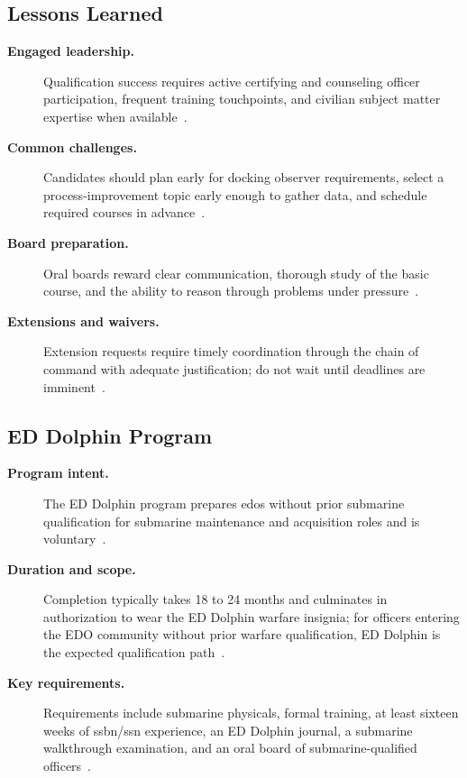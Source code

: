 \documentclass[../main.tex]{subfiles}
\begin{document}
\subsection{Lessons Learned}
\begin{description}
  \item[\textbf{Engaged leadership.}] Qualification success requires active certifying and counseling officer
  participation, frequent training touchpoints, and civilian subject matter expertise when available~\autocite{edo-5-2-2-edqp-2025}.
  \item[\textbf{Common challenges.}] Candidates should plan early for docking observer requirements, select
  a process-improvement topic early enough to gather data, and schedule required courses in advance~\autocite{edo-5-2-2-edqp-2025}.
  \item[\textbf{Board preparation.}] Oral boards reward clear communication, thorough study of the basic
  course, and the ability to reason through problems under pressure~\autocite{edo-5-2-2-edqp-2025}.
  \item[\textbf{Extensions and waivers.}] Extension requests require timely coordination through the chain
  of command with adequate justification; do not wait until deadlines are imminent~\autocite{edo-5-2-2-edqp-2025}.
\end{description}

\subsection{ED Dolphin Program}
\begin{description}
  \item[\textbf{Program intent.}] The ED Dolphin program prepares \ac{edo}s without prior submarine
  qualification for submarine maintenance and acquisition roles and is voluntary~\autocite{edo-5-2-2-edqp-2025}.
  \item[\textbf{Duration and scope.}] Completion typically takes 18 to 24 months and culminates in
  authorization to wear the ED Dolphin warfare insignia; for officers entering the EDO community without prior warfare qualification, ED Dolphin is the expected qualification path~\autocite{edo-5-2-2-edqp-2025,MILPERSMAN-1301-220-EDO-Assignment}.
  \item[\textbf{Key requirements.}] Requirements include submarine physicals, formal training, at least
  sixteen weeks of \ac{ssbn}/\ac{ssn} experience, an ED Dolphin journal, a submarine walkthrough
  examination, and an oral board of submarine-qualified officers~\autocite{edo-5-2-2-edqp-2025}.
\end{description}
\end{document}
